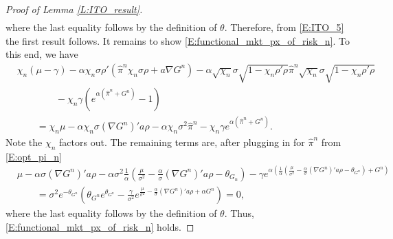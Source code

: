 \documentclass[11pt, letterpaper]{amsart}
\theoremstyle{definition}
\theoremstyle{remark}
\numberwithin{equation}{section}
\newcommand{\hpi}{\hat{\pi}}
\begin{document}
\begin{proof}[Proof of Lemma \ref{L:ITO_result}]
\begin{equation*}
\begin{split}
\end{split}
\end{equation*}
where the last equality follows by the definition of $\theta$.  Therefore, from \eqref{E:ITO_5} the first result follows.  It remains to show \eqref{E:functional_mkt_px_of_risk_n}. To this end, we have
\begin{equation*}
\begin{split}
&\chi_n(\mu-\gamma) -\alpha \chi_n\sigma\rho'\left(\hpi^n\chi_n\sigma \rho + a\nabla G^n\right) -\alpha \sqrt{\chi_n}\sigma\sqrt{1-\chi_n\rho'\rho}\hpi^n\sqrt{\chi_n}\sigma\sqrt{1-\chi_n\rho'\rho}\\
&\qquad\qquad  - \chi_n\gamma \left(e^{\alpha\left(\hpi^n + G^n\right)}-1\right)\\
&\qquad = \chi_n\mu - \alpha\chi_n\sigma(\nabla G^n)'a\rho - \alpha\chi_n\sigma^2\hpi^n - \chi_n \gamma e^{\alpha\left(\hpi^n + G^n\right)}.
\end{split}
\end{equation*}
Note the $\chi_n$ factors out.  The remaining terms are, after plugging in for $\hpi^n$ from \eqref{E:opt_pi_n}
\begin{equation*}
\begin{split}
&\mu - \alpha\sigma(\nabla G^n)'a\rho - \alpha\sigma^2\frac{1}{\alpha}\left(\frac{\mu}{\sigma^2} - \frac{\alpha}{\sigma}(\nabla G^n)'a\rho - \theta_{G_n}\right) - \gamma e^{\alpha\left(\frac{1}{\alpha}\left(\frac{\mu}{\sigma^2} - \frac{\alpha}{\sigma}(\nabla G^n)'a\rho - \theta_{G^n}\right) + G^n\right)}\\
&\qquad = \sigma^2e^{-\theta_{G^n}}\left(\theta_{G^n}e^{\theta_{G^n}} - \frac{\gamma}{\sigma^2}e^{\frac{\mu}{\sigma^2} - \frac{\alpha}{\sigma}(\nabla G^n)'a\rho + \alpha G^n}\right) = 0,
\end{split}
\end{equation*}
where the last equality follows by the definition of $\theta$.  Thus, \eqref{E:functional_mkt_px_of_risk_n} holds.
\end{proof}

\end{document}
